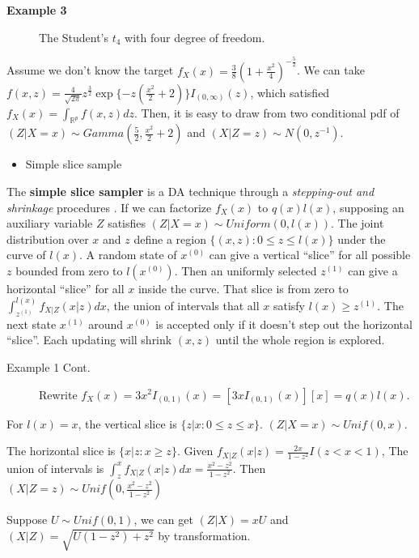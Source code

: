 \documentclass[12pt]{article}
\providecommand{\tightlist}{%
  \setlength{\itemsep}{0pt}\setlength{\parskip}{0pt}}
\begin{document}
\begin{description}
\item[\textbf{Example 3}]
The Student's \(t_4\) with four degree of freedom.
\end{description}

Assume we don't know the target
\(f_{X}(x)=\frac38(1+\frac{x^2}4)^{-\frac52}\). We can take
\(f(x,z)=\frac{4}{\sqrt{2\pi}}z^{\frac32}\exp\{-z(\frac{x^2}{2}+2)\} I_{(0,\infty)}(z)\),
which satisfied \(f_{X}(x)=\int_{\mathbb{R}^p} f(x,z)dz\). Then, it is
easy to draw from two conditional pdf of
\((Z|X=x) \sim Gamma(\frac52,\frac{x^2}2+2)\) and
\((X|Z=z) \sim N(0,z^{-1})\).

\begin{itemize}
\tightlist
\item
  Simple slice sample
\end{itemize}

The \textbf{simple slice sampler} is a DA technique through a
\emph{stepping-out and shrinkage} procedures
\citep{nealSliceSampling2003}. If we can factorize \(f_{X}(x)\) to
\(q(x)l(x)\), supposing an auxiliary variable \(Z\) satisfies
\((Z|X=x)\sim Uniform(0,l(x))\). The joint distribution over \(x\) and
\(z\) define a region \(\{(x,z):0\le z\le l(x)\}\) under the curve of
\(l(x)\). A random state of \(x^{(0)}\) can give a vertical ``slice''
for all possible \(z\) bounded from zero to \(l(x^{(0)})\). Then an
uniformly selected \(z^{(1)}\) can give a horizontal ``slice'' for all
\(x\) inside the curve. That slice is from zero to
\(\int_{z^{(1)}}^{l(x)} f_{X|Z}(x|z)dx\), the union of intervals that
all \(x\) satisfy \(l(x)\ge z^{(1)}\). The next state \(x^{(1)}\) around
\(x^{(0)}\) is accepted only if it doesn't step out the horizontal
``slice''. Each updating will shrink \((x,z)\) until the whole region is
explored.

\begin{description}
\item[Example 1 Cont.]
Rewrite \(f_{X}(x)=3x^{2}I_{(0,1)}(x)=[3x I_{(0,1)}(x)][x]=q(x)l(x)\).
\end{description}

For \(l(x)=x\), the vertical slice is \(\{z|x: 0\le z\le x \}\).
\((Z|X=x) \sim Unif(0,x)\).

The horizontal slice is \(\{x|z: x\ge z\}\). Given
\(f_{X|Z}(x|z)=\frac{2x}{1-z^2}I(z<x<1)\), The union of intervals is
\(\int_z^x f_{X|Z}(x|z)dx=\frac{x^2-z^2}{1-z^2}\). Then
\((X|Z=z)\sim Unif(0,\frac{x^2-z^2}{1-z^2})\)

Suppose \(U \sim Unif(0,1)\), we can get \((Z|X)=xU\) and
\((X|Z)=\sqrt{U(1-z^2)+z^2}\) by transformation.
\end{document}
